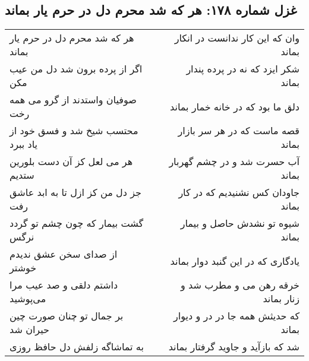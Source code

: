 \begin{center}
\section*{غزل شماره ۱۷۸: هر که شد محرم دل در حرم یار بماند}
\label{sec:sh178}
\begin{longtable}{l p{0.5cm} r}
هر که شد محرم دل در حرم یار بماند
&&
وان که این کار ندانست در انکار بماند
\\
اگر از پرده برون شد دل من عیب مکن
&&
شکر ایزد که نه در پرده پندار بماند
\\
صوفیان واستدند از گرو می همه رخت
&&
دلق ما بود که در خانه خمار بماند
\\
محتسب شیخ شد و فسق خود از یاد ببرد
&&
قصه ماست که در هر سر بازار بماند
\\
هر می لعل کز آن دست بلورین ستدیم
&&
آب حسرت شد و در چشم گهربار بماند
\\
جز دل من کز ازل تا به ابد عاشق رفت
&&
جاودان کس نشنیدیم که در کار بماند
\\
گشت بیمار که چون چشم تو گردد نرگس
&&
شیوه تو نشدش حاصل و بیمار بماند
\\
از صدای سخن عشق ندیدم خوشتر
&&
یادگاری که در این گنبد دوار بماند
\\
داشتم دلقی و صد عیب مرا می‌پوشید
&&
خرقه رهن می و مطرب شد و زنار بماند
\\
بر جمال تو چنان صورت چین حیران شد
&&
که حدیثش همه جا در در و دیوار بماند
\\
به تماشاگه زلفش دل حافظ روزی
&&
شد که بازآید و جاوید گرفتار بماند
\\
\end{longtable}
\end{center}
